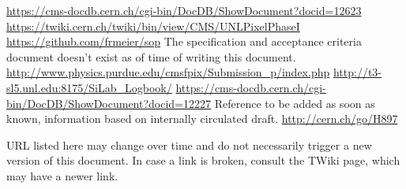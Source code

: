 \documentclass[12pt]{unlsilabsop}
\begin{document}
\begin{thebibliography}{aaaaaaaa}
     \url{https://cms-docdb.cern.ch/cgi-bin/DocDB/ShowDocument?docid=12623}
     \url{https://twiki.cern.ch/twiki/bin/view/CMS/UNLPixelPhaseI}
     \url{https://github.com/frmeier/sop}
     The specification and acceptance criteria document doesn't exist as of time of writing this document.
     \url{http://www.physics.purdue.edu/cmsfpix/Submission_p/index.php}
     \url{http://t3-sl5.unl.edu:8175/SiLab_Logbook/}
     \url{https://cms-docdb.cern.ch/cgi-bin/DocDB/ShowDocument?docid=12227}
     Reference to be added as soon as known, information based on internally circulated draft.
     \url{http://cern.ch/go/H897}
\end{thebibliography}
URL listed here may change over time and do not necessarily trigger a new version of this document. In case a link is broken, consult the TWiki page, which may have a newer link.
\end{document}

